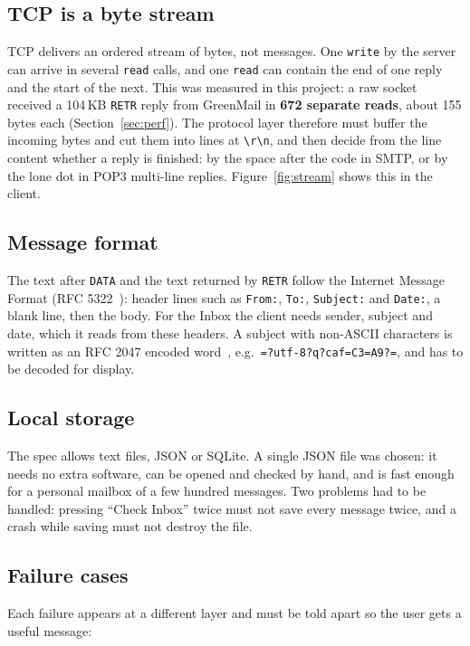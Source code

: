 \documentclass[11pt,a4paper]{article}
\begin{document}
\subsection{TCP is a byte stream}

TCP delivers an ordered stream of bytes, not messages. One \texttt{write} by the server can
arrive in several \texttt{read} calls, and one \texttt{read} can contain the end of one reply
and the start of the next. This was measured in this project: a raw socket received a
104\,KB \texttt{RETR} reply from GreenMail in \textbf{672 separate reads}, about 155 bytes
each (Section~\ref{sec:perf}). The protocol layer therefore must buffer the incoming bytes
and cut them into lines at \verb|\r\n|, and then decide from the line content whether a reply
is finished: by the space after the code in SMTP, or by the lone dot in POP3 multi-line
replies. Figure~\ref{fig:stream} shows this in the client.

\subsection{Message format}

The text after \texttt{DATA} and the text returned by \texttt{RETR} follow the Internet
Message Format (RFC 5322~\cite{rfc5322}): header lines such as \texttt{From:},
\texttt{To:}, \texttt{Subject:} and \texttt{Date:}, a blank line, then the body. For the
Inbox the client needs sender, subject and date, which it reads from these headers. A
subject with non-ASCII characters is written as an RFC 2047 encoded word~\cite{rfc2047},
e.g.\ \texttt{=?utf-8?q?caf=C3=A9?=}, and has to be decoded for display.

\subsection{Local storage}

The spec allows text files, JSON or SQLite. A single JSON file was chosen: it needs no
extra software, can be opened and checked by hand, and is fast enough for a personal
mailbox of a few hundred messages. Two problems had to be handled: pressing ``Check Inbox''
twice must not save every message twice, and a crash while saving must not destroy the file.

\subsection{Failure cases}

Each failure appears at a different layer and must be told apart so the user gets a useful
message:
\end{document}
